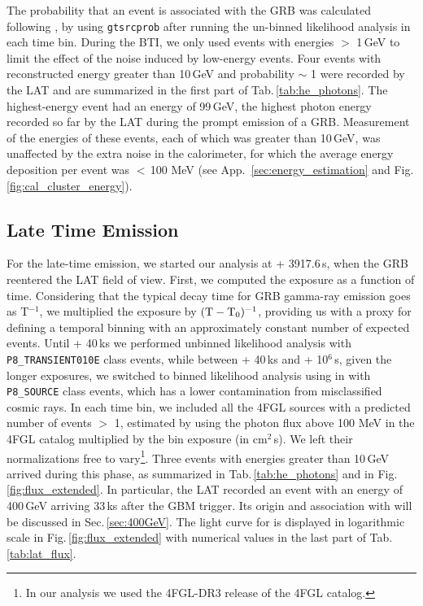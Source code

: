 \documentclass[preprint]{aastex631}
\begin{document}
The probability that an event is  associated with the GRB was calculated following \citet{2FLGC}, by using \texttt{gtsrcprob} after running the un-binned likelihood analysis in each time bin. During the BTI, we only used events with energies $>$ 1\,GeV to limit the effect of the noise induced by low-energy events. Four events with reconstructed energy greater than 10\,GeV and probability $\sim$ 1 were recorded by the LAT and are summarized in the first part of Tab.\,\ref{tab:he_photons}. 
The highest-energy event had an energy of 99\,GeV, the highest photon energy recorded so far by the LAT during the prompt emission of a GRB.
Measurement of the energies of these events, each of which was greater than 10\,GeV, was unaffected by the extra noise in the calorimeter, for which the average energy deposition per event was $<$\,100 MeV (see App.~\ref{sec:energy_estimation} and Fig.\ref{fig:cal_cluster_energy}).

\subsection{Late Time Emission}
\label{sec:afterglow}
For the late-time emission, we started our analysis at \trig + 3917.6\,s, when the GRB reentered the LAT field of view. 
First, we computed the exposure as a function of time. Considering that the typical decay time for GRB gamma-ray emission goes as T$^{-1}$, we multiplied the exposure by $\rm (T-T_0)^{-1}$, providing us with a proxy for defining a temporal binning with an approximately constant number of expected events. 
Until \trig + 40\,ks we performed unbinned likelihood analysis with \texttt{P8\_TRANSIENT010E} class events, while between \trig + 40\,ks and \trig + 10$^6$\,s, given the longer exposures, we switched to binned likelihood analysis using \fermipy in \ThreeML with \texttt{P8\_SOURCE} class events, which has a lower contamination from misclassified cosmic rays.
In each time bin, we included all the 4FGL \citep{4FGL} sources with a predicted number of events $>$ 1, estimated by using the photon flux above 100 MeV in the 4FGL catalog multiplied by the bin exposure (in cm$^{2}$\,s). We left their normalizations free to vary\footnote{In our analysis we used the 4FGL-DR3 release of the 4FGL catalog.}.
Three events with energies greater than 10\,GeV arrived during this phase, as summarized in Tab.\,\ref{tab:he_photons} and in Fig.\,\ref{fig:flux_extended}. In particular, the LAT recorded an event with an energy of 400\,GeV \citep{2022GCN.32748....1X} arriving 33\,ks after the GBM trigger. Its origin and association with \grb will be discussed in Sec.\,\ref{sec:400GeV}. The light curve for \grb is displayed in logarithmic scale in Fig.\,\ref{fig:flux_extended} with numerical values in the last part of Tab.\,\ref{tab:lat_flux}.
\end{document}
